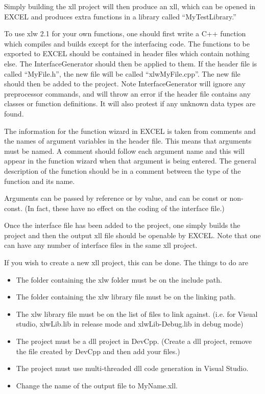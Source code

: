 \documentclass[12pt,reqno]{amsart}
\numberwithin{equation}{section}
\numberwithin{figure}{section}
\begin{document}
Simply building the xll project will then produce an xll, which can be
opened in EXCEL and produces extra functions in a library called
``MyTestLibrary.'' 

To use xlw 2.1 for your own functions, one should first write a C++
function which compiles 
and builds except for the interfacing code. The functions to be
exported to EXCEL should be contained in header files which contain
nothing else. The InterfaceGenerator should then be applied to
them. If the header file is called ``MyFile.h'', the new file will be
called ``xlwMyFile.cpp''. The new file should then be added to the
project. Note InterfaceGenerator will ignore any preprocessor
commands, and will throw an error if the header file contains any
classes or function definitions. It will also protest if any unknown
data types are found. 

The information for the function wizard in EXCEL is taken from
comments and the names of argument variables in the header file. This
means that arguments must be named. A comment should follow each
argument name and this will appear in the function wizard when that
argument is being entered. The general description of the function
should be in a comment between the type of the function and its name. 

Arguments can be passed by reference or by value, and can be const or
non-const. (In fact, these have no effect on the coding of the
interface file.)

Once  the interface file has been added to the project, one simply
builds the project
and then the output xll file should be openable by EXCEL. Note that
one can
have any number of interface files in the same xll project. 

If you wish to create a new xll project, this can be done. The things
to do are 
\begin{itemize}
\item The folder containing the xlw folder must be on the include path.
\item The folder containing the xlw library file must be on the linking
  path.
\item The xlw library file must be on the list of files to link
  against. (i.e. for Visual studio, 
 xlwLib.lib in release mode and xlwLib-Debug.lib in
  debug mode)
\item The project must be a dll project in DevCpp. (Create a dll
  project, remove the file created by DevCpp and then add your files.) 
\item The project must use multi-threaded dll code generation in
  Visual Studio. 
\item Change the name of the output file to MyName.xll. 
\end{itemize}
\end{document}
